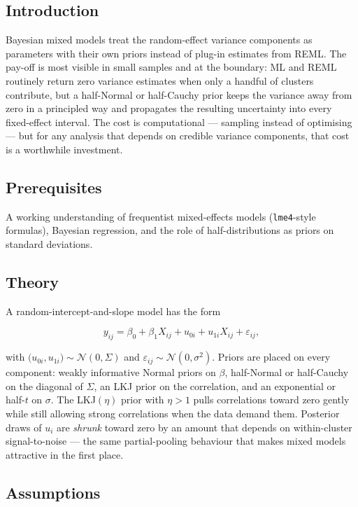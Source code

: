 \documentclass[
]{article}
\author{}
\date{\vspace{-2.5em}}
\begin{document}
\subsection{Introduction}\label{introduction}

Bayesian mixed models treat the random-effect variance components as
parameters with their own priors instead of plug-in estimates from REML.
The pay-off is most visible in small samples and at the boundary: ML and
REML routinely return zero variance estimates when only a handful of
clusters contribute, but a half-Normal or half-Cauchy prior keeps the
variance away from zero in a principled way and propagates the resulting
uncertainty into every fixed-effect interval. The cost is computational
--- sampling instead of optimising --- but for any analysis that depends
on credible variance components, that cost is a worthwhile investment.

\subsection{Prerequisites}\label{prerequisites}

A working understanding of frequentist mixed-effects models
(\texttt{lme4}-style formulas), Bayesian regression, and the role of
half-distributions as priors on standard deviations.

\subsection{Theory}\label{theory}

A random-intercept-and-slope model has the form

\[y_{ij} = \beta_0 + \beta_1 X_{ij} + u_{0i} + u_{1i} X_{ij} + \varepsilon_{ij},\]

with \(\bigl(u_{0i}, u_{1i}\bigr) \sim \mathcal N(0, \Sigma)\) and
\(\varepsilon_{ij} \sim \mathcal N(0, \sigma^2)\). Priors are placed on
every component: weakly informative Normal priors on \(\beta\),
half-Normal or half-Cauchy on the diagonal of \(\Sigma\), an LKJ prior
on the correlation, and an exponential or half-\(t\) on \(\sigma\). The
LKJ\((\eta)\) prior with \(\eta > 1\) pulls correlations toward zero
gently while still allowing strong correlations when the data demand
them. Posterior draws of \(u_i\) are \emph{shrunk} toward zero by an
amount that depends on within-cluster signal-to-noise --- the same
partial-pooling behaviour that makes mixed models attractive in the
first place.

\subsection{Assumptions}\label{assumptions}
\end{document}

